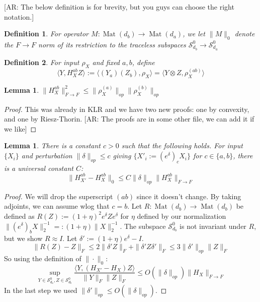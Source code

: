 \documentclass{article}
\newtheorem{lemma}[theorem]{Lemma}
\newtheorem{definition}{Definition}
\newcommand{\mat}{\operatorname{Mat}}
\newcommand\Sym{\mathcal{S}}
\newcommand{\AR}[1]{{\color{orange}[AR: #1]}}
\begin{document}
\AR{The below definition is for brevity, but you guys can choose the right notation.}
\begin{definition}
For operator $M : \mat(d_{b}) \to \mat(d_{a})$, we let $\|M\|_{0}$ denote the $F \to F$ norm of its restriction to the traceless subspaces $\Sym^0_{d_b} \to \Sym^0_{d_a}$
\end{definition}

\begin{definition}
For input $\rho_{X}$ and fixed $a,b$, define
\[ \langle Y, H_{X}^{ab} Z \rangle := \langle (Y_{a})(Z_{b}), \rho_{X} \rangle = \langle Y \otimes Z , \rho_{X}^{(ab)} \rangle     \]
\end{definition}

\begin{lemma} \label{inftyto2}
$\|H_{X}^{ab}\|_{F \to F}^{2} \leq \|\rho_{X}^{(a)}\|_{op} \|\rho_{X}^{(b)}\|_{op}$
\end{lemma}
\begin{proof}
This was already in KLR and we have two new proofs: one by convexity, and one by Riesz-Thorin. \AR{The proofs are in some other file, we can add it if we like}
\end{proof}

\begin{lemma} \label{btoabRobustness}
There is a constant $c>0$ such that the following holds. For input $\{X_{i}\}$ and perturbation $\|\delta\|_{op} \leq c$ giving $\{X'_{i} := (e^{\delta})_{c} X_{i} \}$ for $c \in \{a,b\}$, there is a universal constant $C$:
\[ \|H_{X'}^{ab} - H_{X}^{ab}\|_{0} \leq C \|\delta\|_{op} \|H_{X}^{ab}\|_{F \to F}    \]
\end{lemma}
\begin{proof}
We will drop the superscript $(ab)$ since it doesn't change. By taking adjoints, we can assume wlog that $c = b$. Let $R : \mat(d_{b}) \to \mat(d_{b})$ be defined as $R(Z) := (1+\eta)^{2} e^{\delta} Z e^{\delta}$ for $\eta$ defined by our normalization $\|(e^{\delta})_{b} X\|_{2}^{-1} =: (1+\eta) \|X\|_{2}^{-1}$. The subspace $\Sym_{d_{b}}^{0}$ is not invariant under $R$, but we show $R \approx I$. Let $\delta' := (1+\eta) e^{\delta} - I$. 
\[ \|R(Z) - Z\|_{F} \leq 2 \|\delta' Z\|_{F} + \|\delta' Z \delta'\|_{F} \leq 3 \|\delta'\|_{op} \|Z\|_{F}    \]
So using the definition of $\|\cdot\|_{0}$:
\[ \sup_{Y \in \Sym_{d_{a}}^{0},Z \in \Sym_{d_{b}}^{0}} \frac{\langle Y, (H_{X'} - H_{X}) Z \rangle}{\|Y\|_{F} \|Z\|_{F}} \leq O(\|\delta\|_{op}) \|H_{X}\|_{F \to F}  \]
In the last step we used $\|\delta'\|_{op} \leq O(\|\delta\|_{op})$.
\end{proof}
\end{document}
